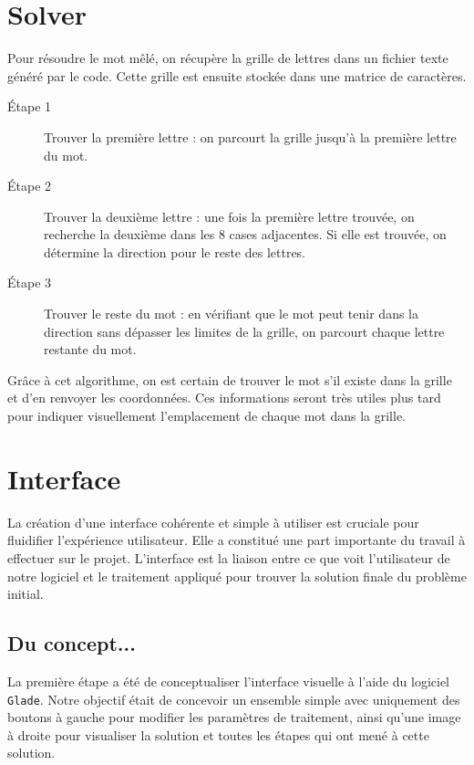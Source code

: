\documentclass{article}
\begin{document}
\section{Solver}
Pour résoudre le mot mêlé, on récupère la grille de lettres dans un fichier texte généré par le code. Cette grille est ensuite stockée dans une matrice de caractères.

\begin{description}
    \item[Étape 1] Trouver la première lettre : on parcourt la grille jusqu'à la première lettre du mot.
    
    \item[Étape 2] Trouver la deuxième lettre : une fois la première lettre trouvée, on recherche la deuxième dans les 8 cases adjacentes. Si elle est trouvée, on détermine la direction pour le reste des lettres.
    
    \item[Étape 3] Trouver le reste du mot : en vérifiant que le mot peut tenir dans la direction sans dépasser les limites de la grille, on parcourt chaque lettre restante du mot.
\end{description}
Grâce à cet algorithme, on est certain de trouver le mot s'il existe dans la grille et d'en renvoyer les coordonnées. Ces informations seront très utiles plus tard pour indiquer visuellement l'emplacement de chaque mot dans la grille.
\clearpage
\section{Interface}
La création d'une interface cohérente et simple à utiliser est cruciale pour fluidifier l'expérience utilisateur. Elle a constitué une part importante du travail à effectuer sur le projet. L'interface est la liaison entre ce que voit l'utilisateur de notre logiciel et le traitement appliqué pour trouver la solution finale du problème initial.\\

\subsection{Du concept...}
La première étape a été de conceptualiser l'interface visuelle à l'aide du logiciel \texttt{Glade}. Notre objectif était de concevoir un ensemble simple avec uniquement des boutons à gauche pour modifier les paramètres de traitement, ainsi qu'une image à droite pour visualiser la solution et toutes les étapes qui ont mené à cette solution.\\
\end{document}
